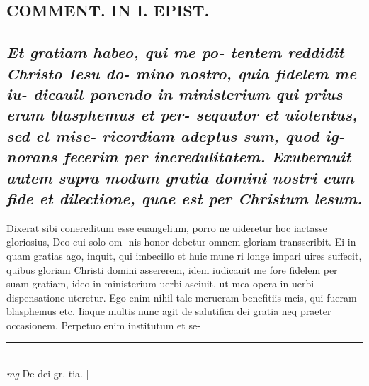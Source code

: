 \documentclass{article}
\begin{document}
\begin{pages}
\section*{COMMENT. IN I. EPIST. }
{}
\subsection*{\textit{Et gratiam habeo, qui me po- tentem reddidit Christo Iesu do- mino nostro, quia fidelem me iu- dicauit ponendo in ministerium qui prius eram blasphemus et per- sequutor et uiolentus, sed et mise- ricordiam adeptus sum, quod ig- norans fecerim per incredulitatem. Exuberauit autem supra modum gratia domini nostri cum fide et dilectione, quae est per Christum lesum. }}\pstart Dixerat sibi conereditum esse euangelium, porro ne uideretur hoc iactasse gloriosius, Deo cui solo om- nis honor debetur omnem gloriam transscribit. Ei in- quam gratias ago, inquit, qui imbecillo et huic mune ri longe impari uires suffecit, quibus gloriam Christi domini assererem, idem iudicauit me fore fidelem per suam gratiam, ideo in ministerium uerbi asciuit, ut mea opera in uerbi dispensatione uteretur. Ego enim nihil tale merueram benefitiis meis, qui fueram blasphemus etc. Iiaque multis nunc agit de salutifica dei gratia neq praeter occasionem. Perpetuo enim institutum et se-  \pend
\vspace{0.5cm}\noindent
\vspace{0.2cm}\rule{1cm}{0.2pt}\\ 
\hspace{0.2cm}\textit{mg}
\footnotesize De dei gr. tia. 
\normalsize| 

\end{pages}
\end{document}
